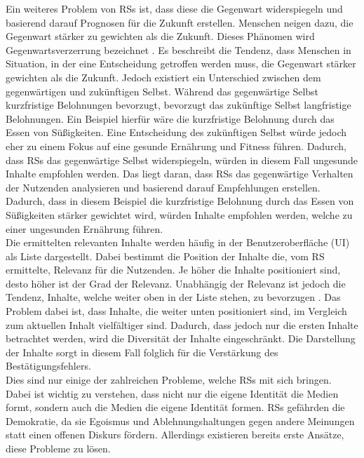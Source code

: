 Ein weiteres Problem von \acp{RS} ist, dass diese die Gegenwart widerspiegeln und basierend darauf Prognosen für die Zukunft erstellen.
Menschen neigen dazu, die Gegenwart stärker zu gewichten als die Zukunft.
Dieses Phänomen wird Gegenwartsverzerrung bezeichnet \cite{present-bias}.
Es beschreibt die Tendenz, dass Menschen in Situation, in der eine Entscheidung getroffen werden muss, die Gegenwart stärker gewichten als die Zukunft.
Jedoch existiert ein Unterschied zwischen dem gegenwärtigen und zukünftigen Selbst.
Während das gegenwärtige Selbst kurzfristige Belohnungen bevorzugt, bevorzugt das zukünftige Selbst langfristige Belohnungen.
Ein Beispiel hierfür wäre die kurzfristige Belohnung durch das Essen von Süßigkeiten.
Eine Entscheidung des zukünftigen Selbst würde jedoch eher zu einem Fokus auf eine gesunde Ernährung und Fitness führen.
Dadurch, dass \acp{RS} das gegenwärtige Selbst widerspiegeln, würden in diesem Fall ungesunde Inhalte empfohlen werden.
Das liegt daran, dass \acp{RS} das gegenwärtige Verhalten der Nutzenden analysieren und basierend darauf Empfehlungen erstellen.
Dadurch, dass in diesem Beispiel die kurzfristige Belohnung durch das Essen von Süßigkeiten stärker gewichtet wird, würden Inhalte empfohlen werden, welche zu einer ungesunden Ernährung führen. \\

Die ermittelten relevanten Inhalte werden häufig in der Benutzeroberfläche (\ac{UI}) als Liste dargestellt.
Dabei bestimmt die Position der Inhalte die, vom \ac{RS} ermittelte, Relevanz für die Nutzenden.
Je höher die Inhalte positioniert sind, desto höher ist der Grad der Relevanz.
Unabhängig der Relevanz ist jedoch die Tendenz, Inhalte, welche weiter oben in der Liste stehen, zu bevorzugen \cite{position-bias}.
Das Problem dabei ist, dass Inhalte, die weiter unten positioniert sind, im Vergleich zum aktuellen Inhalt vielfältiger sind.
Dadurch, dass jedoch nur die ersten Inhalte betrachtet werden, wird die Diversität der Inhalte eingeschränkt.
Die Darstellung der Inhalte sorgt in diesem Fall folglich für die Verstärkung des Bestätigungsfehlers. \\

Dies sind nur einige der zahlreichen Probleme, welche \acp{RS} mit sich bringen.
Dabei ist wichtig zu verstehen, dass nicht nur die eigene Identität die Medien formt, sondern auch die Medien die eigene Identität formen.
\acp{RS} gefährden die Demokratie, da sie Egoismus und Ablehnungshaltungen gegen andere Meinungen statt einen offenen Diskurs fördern.
Allerdings existieren bereits erste Ansätze, diese Probleme zu lösen. \\

